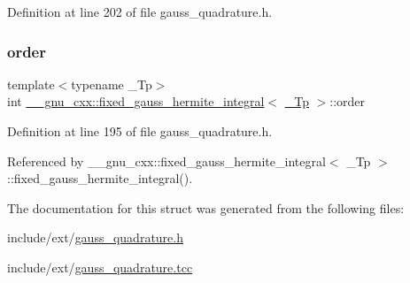 Definition at line 202 of file gauss\+\_\+quadrature.\+h.

\mbox{\label{struct____gnu__cxx_1_1fixed__gauss__hermite__integral_ad2678dce9fba6604be4d2839c6bc7646}} 
\subsubsection{\texorpdfstring{order}{order}}
{\footnotesize\ttfamily template$<$typename \+\_\+\+Tp$>$ \\
int \hyperlink{struct____gnu__cxx_1_1fixed__gauss__hermite__integral}{\+\_\+\+\_\+gnu\+\_\+cxx\+::fixed\+\_\+gauss\+\_\+hermite\+\_\+integral}$<$ \hyperlink{namespace____gnu__cxx_a3b19a9c800ca194374ef9172290f7d79}{\+\_\+\+Tp} $>$\+::order}



Definition at line 195 of file gauss\+\_\+quadrature.\+h.



Referenced by \+\_\+\+\_\+gnu\+\_\+cxx\+::fixed\+\_\+gauss\+\_\+hermite\+\_\+integral$<$ \+\_\+\+Tp $>$\+::fixed\+\_\+gauss\+\_\+hermite\+\_\+integral().



The documentation for this struct was generated from the following files\+:\begin{DoxyCompactItemize}
\item 
include/ext/\hyperlink{gauss__quadrature_8h}{gauss\+\_\+quadrature.\+h}\item 
include/ext/\hyperlink{gauss__quadrature_8tcc}{gauss\+\_\+quadrature.\+tcc}\end{DoxyCompactItemize}
